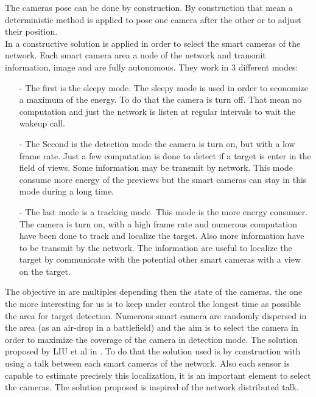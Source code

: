 The cameras pose can be done by construction. By construction that mean a deterministic method is applied to pose one camera after the other or to adjust their position.\\
In \cite{38*liu2010} a constructive solution is applied in order to select the smart cameras of the network. Each smart camera area a node of the network and transmit information, image and are fully autonomous. 
They work in 3 different modes:\\
\begin{itemize}
\item[-] The first is the sleepy mode. The sleepy mode is used in order to economize a maximum of the energy. To do that the camera is turn off. That mean no computation and just the network is listen at regular intervals to wait the wakeup call.   \\

\item[-] The Second is the detection mode the camera is turn on, but with a low frame rate. Just a few computation is done to detect if a target is enter in the field of views. Some information may be transmit by network. This mode consume more energy of the previews but the smart cameras can stay in this mode during a long time.\\

\item[-] The last mode is a tracking mode. This mode is the more energy consumer. The camera is turn on, with a high frame rate and numerous computation have been done to track and localize the target. Also more information have to be transmit by the network. The information are useful to localize the target by communicate with  the potential other smart cameras with a view on the target. \\
\end{itemize}
The objective in \cite{38*liu2010} are multiples depending then the state of the cameras. the one the more interesting for us is to keep under control the longest time as possible the area for target detection. Numerous smart camera are randomly dispersed in the area (as an air-drop in a battlefield) and the aim is to select the camera in order to maximize the coverage of the camera in detection mode. The solution proposed by LIU  et al in \cite{38*liu2010}.
To do that the solution used is by construction with using a talk between each smart cameras of the network. Also each sensor is capable to estimate precisely this localization, it is an important element to select the cameras. The solution proposed is inspired of the network distributed talk. \\
